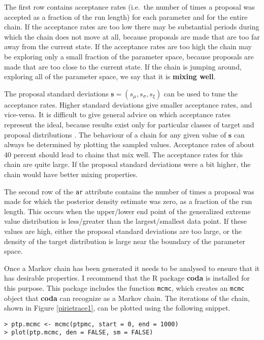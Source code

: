 \documentclass[11pt,a4paper]{article}
\newcommand{\bs}{\boldsymbol}
\begin{document}
The first row contains acceptance rates (i.e.\ the number of times a proposal was accepted as a fraction of the run length) for each parameter and for the entire chain.
If the acceptance rates are too low there may be substantial periods during which the chain does not move at all, because proposals are made that are too far away from the current state.
If the acceptance rates are too high the chain may be exploring only a small fraction of the parameter space, because proposals are made that are too close to the current state.
If the chain is jumping around, exploring all of the parameter space, we say that it is \textbf{mixing well}.

The proposal standard deviations $\bs{s} = (s_\mu,s_\sigma,s_\xi)$ can be used to tune the acceptance rates.
Higher standard deviations give smaller acceptance rates, and vice-versa.
It is difficult to give general advice on which acceptance rates represent the ideal, because results exist only for particular classes of target and proposal distributions \citep[e.g.][]{gelmcarl95}.
The behaviour of a chain for any given value of $\bs{s}$ can always be determined by plotting the sampled values. 
Acceptance rates of about 40 percent should lead to chains that mix well.
The acceptance rates for this chain are quite large. 
If the proposal standard deviations were a bit higher, the chain would have better mixing properties.

The second row of the \verb+ar+ attribute contains the number of times a proposal was made for which the posterior density estimate was zero, as a fraction of the run length.
This occurs when the upper/lower end point of the generalized extreme value distribution is less/greater than the largest/smallest data point. 
If these values are high, either the proposal standard deviations are too large, or the density of the target distribution is large near the boundary of the parameter space. 

Once a Markov chain has been generated it needs to be analysed to ensure that it has desirable properties.
I recommend that the R package \textbf{coda} is installed for this purpose.
This package includes the function \verb+mcmc+, which creates an \verb+mcmc+ object that \textbf{coda} can recognize as a Markov chain.
The iterations of the chain, shown in Figure \ref{pirietrace1}, can be plotted using the following snippet.

\begin{verbatim}
> ptp.mcmc <- mcmc(ptpmc, start = 0, end = 1000)
> plot(ptp.mcmc, den = FALSE, sm = FALSE)
\end{verbatim}
\end{document}
